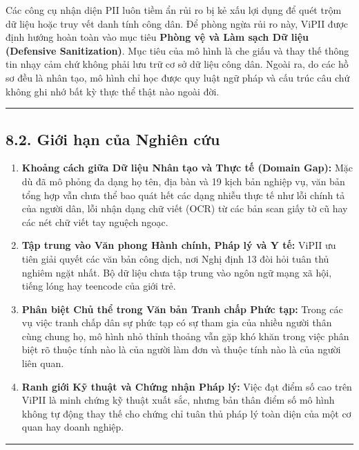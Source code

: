 \documentclass[
  11pt,
  a4paper,
]{article}
\providecommand{\tightlist}{%
  \setlength{\itemsep}{0pt}\setlength{\parskip}{0pt}}
\begin{document}
Các công cụ nhận diện PII luôn tiềm ẩn rủi ro bị kẻ xấu lợi dụng để quét trộm dữ liệu hoặc truy vết
danh tính công dân. Để phòng ngừa rủi ro này, ViPII được định hướng hoàn toàn vào mục tiêu
\textbf{Phòng vệ và Làm sạch Dữ liệu (Defensive Sanitization)}. Mục tiêu của mô hình là che giấu và
thay thế thông tin nhạy cảm chứ không phải lưu trữ cơ sở dữ liệu công dân. Ngoài ra, do các hồ sơ
đều là nhân tạo, mô hình chỉ học được quy luật ngữ pháp và cấu trúc câu chứ không ghi nhớ bất kỳ
thực thể thật nào ngoài đời.

\begin{center}\rule{0.5\linewidth}{0.5pt}\end{center}

\subsection{8.2. Giới hạn của Nghiên cứu}\label{giux1edbi-hux1ea1n-cux1ee7a-nghiuxean-cux1ee9u}

\begin{enumerate}
\def\labelenumi{\arabic{enumi}.}
\tightlist
\item
  \textbf{Khoảng cách giữa Dữ liệu Nhân tạo và Thực tế (Domain Gap):} Mặc dù đã mô phỏng đa dạng họ
  tên, địa bàn và 19 kịch bản nghiệp vụ, văn bản tổng hợp vẫn chưa thể bao quát hết các dạng nhiễu
  thực tế như lỗi chính tả của người dân, lỗi nhận dạng chữ viết (OCR) từ các bản scan giấy tờ cũ
  hay các nét chữ viết tay nguệch ngoạc.
\item
  \textbf{Tập trung vào Văn phong Hành chính, Pháp lý và Y tế:} ViPII ưu tiên giải quyết các văn bản
  công dịch, nơi Nghị định 13 đòi hỏi tuân thủ nghiêm ngặt nhất. Bộ dữ liệu chưa tập trung vào ngôn
  ngữ mạng xã hội, tiếng lóng hay teencode của giới trẻ.
\item
  \textbf{Phân biệt Chủ thể trong Văn bản Tranh chấp Phức tạp:} Trong các vụ việc tranh chấp dân sự
  phức tạp có sự tham gia của nhiều người thân cùng chung họ, mô hình nhỏ thỉnh thoảng vẫn gặp khó
  khăn trong việc phân biệt rõ thuộc tính nào là của người làm đơn và thuộc tính nào là của người
  liên quan.
\item
  \textbf{Ranh giới Kỹ thuật và Chứng nhận Pháp lý:} Việc đạt điểm số cao trên ViPII là minh chứng
  kỹ thuật xuất sắc, nhưng bản thân điểm số mô hình không tự động thay thế cho chứng chỉ tuân thủ
  pháp lý toàn diện của một cơ quan hay doanh nghiệp.
\end{enumerate}

\begin{center}\rule{0.5\linewidth}{0.5pt}\end{center}
\end{document}
